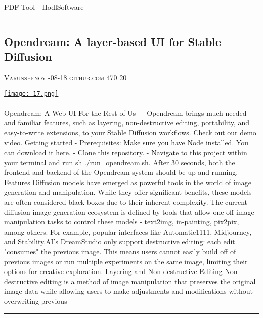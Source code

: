 \documentclass[10pt,a4paper]{article}
\begin{document}
\begin{multicols*}{2}
\paragraph{}
PDF Tool - HodlSoftware
\par\noindent\textcolor{red}{\rule{\linewidth}{0.2mm}}
\vfill
\null
\noindent\begin{minipage}{\linewidth}
\subsection{Opendream: A layer-based UI for Stable Diffusion}
\textsc{\footnotesize
{\scriptsize\faUser}\space 
Varunshenoy 
{\scriptsize\faCalendar}-08-18 
{\scriptsize\faGithub}\space 
github.com 
{\scriptsize\faThumbsOUp}\space 
\href{http://news.ycombinator.com/item?id=37136898\&utm\_term=comment}{470} 
{\scriptsize\faComments}\space 
\href{http://news.ycombinator.com/item?id=37136898\&utm\_term=comment}{20} 
}
\par\medskip\noindent
\href{https://github.com/varunshenoy/opendream?utm\_source=hackernewsletter\&utm\_medium=email\&utm\_term=show\_hn}{
    \texttt{[image: 17.png]}
}
\end{minipage}
\paragraph{}
Opendream: A Web UI For the Rest of Us 💭 🎨
Opendream brings much needed and familiar features, such as layering, non-destructive editing, portability, and easy-to-write extensions, to your Stable Diffusion workflows. Check out our demo video.
Getting started
- Prerequisites: Make sure you have Node installed. You can download it here.
- Clone this repository.
- Navigate to this project within your terminal and run
sh ./run\_opendream.sh. After \~30 seconds, both the frontend and backend of the Opendream system should be up and running.
Features
Diffusion models have emerged as powerful tools in the world of image generation and manipulation. While they offer significant benefits, these models are often considered black boxes due to their inherent complexity. The current diffusion image generation ecosystem is defined by tools that allow one-off image manipulation tasks to control these models - text2img, in-painting, pix2pix, among others.
For example, popular interfaces like Automatic1111, Midjourney, and Stability.AI's DreamStudio only support destructive editing: each edit "consumes" the previous image. This means users cannot easily build off of previous images or run multiple experiments on the same image, limiting their options for creative exploration.
Layering and Non-destructive Editing
Non-destructive editing is a method of image manipulation that preserves the original image data while allowing users to make adjustments and modifications without overwriting previous 
\par\noindent\textcolor{red}{\rule{\linewidth}{0.2mm}}
\vfill
\null
\noindent\begin{minipage}{\linewidth}

\end{minipage}
\end{multicols*}
\end{document}
